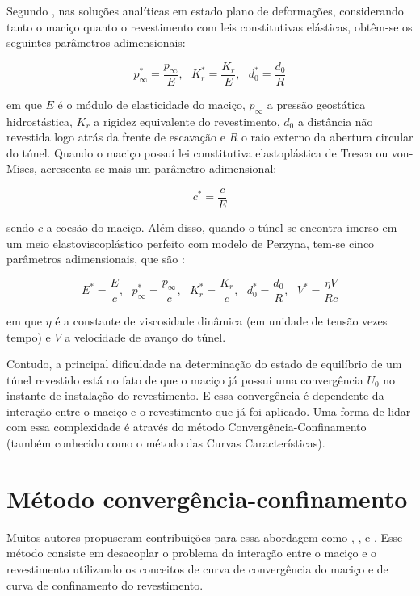 Segundo , nas soluções analíticas em estado plano de deformações, considerando tanto o maciço quanto o revestimento com leis constitutivas elásticas, obtêm-se os seguintes parâmetros adimensionais:

\begin{equation}
	p_\infty^* = \frac{p_\infty}{E},~~~ K_r^* = \frac{K_r}{E},~~~ d_0^* = \frac{d_0}{R} 
\end{equation}

em que $E$ é o módulo de elasticidade do maciço, $p_\infty$ a pressão geostática hidrostástica, $K_r$ a rigidez equivalente do revestimento, $d_0$ a distância não revestida logo atrás da frente de escavação e $R$ o raio externo da abertura circular do túnel. Quando o maciço possuí lei constitutiva elastoplástica de Tresca ou von-Mises, acrescenta-se mais um parâmetro adimensional:

\begin{equation}
	c^* = \frac{c}{E} 
\end{equation}

sendo $c$ a coesão do maciço. Além disso, quando o túnel se encontra imerso em um meio elastoviscoplástico perfeito com modelo de Perzyna, tem-se cinco parâmetros adimensionais, que são \cite[p. 198]{Bernaud1991}:

\begin{equation}
	E^* = \frac{E}{c},~~~ p_\infty^* = \frac{p_\infty}{c},~~~ K_r^* = \frac{K_r}{c},~~~ d_0^* = \frac{d_0}{R},~~~ V^*=\frac{\eta V}{Rc}
\end{equation}

em que $\eta$ é a constante de viscosidade dinâmica (em unidade de tensão vezes tempo) e $V$ a velocidade de avanço do túnel.

Contudo, a principal dificuldade na determinação do estado de equilíbrio de um túnel revestido está no fato de que o maciço já possui uma convergência $U_0$ no instante de instalação do revestimento. E essa convergência é dependente da interação entre o maciço e o revestimento que já foi aplicado. Uma forma de lidar com essa complexidade é através do método Convergência-Confinamento (também conhecido como o método das Curvas Características).

\section{Método convergência-confinamento}

Muitos autores propuseram contribuições para essa abordagem como , ,  e . Esse método consiste em desacoplar o problema da interação entre o maciço e o revestimento utilizando os conceitos de curva de convergência do maciço e de curva de confinamento do revestimento. 

